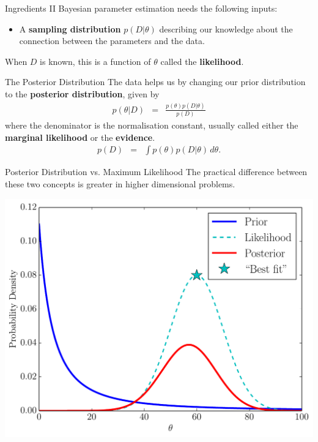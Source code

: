\documentclass{beamer}
\begin{document}
\begin{frame}[t]{Ingredients II}
Bayesian parameter estimation needs the following inputs:
\begin{itemize}
\item A {\bf sampling distribution} $p(D | \theta)$ describing our knowledge
about the connection between the parameters and the data.
\end{itemize}

When $D$ is known,
this is a function of $\theta$ called the {\bf likelihood}.
\end{frame}


\begin{frame}[t]{The Posterior Distribution}
The data helps us by changing our prior distribution to the {\bf posterior
distribution}, given by
\begin{eqnarray*}
p(\theta | D) &=& \frac{p(\theta) p(D|\theta)}{p(D)}
\end{eqnarray*}
where the denominator is the normalisation constant, usually called either
the {\bf marginal likelihood} or the {\bf evidence}.
\begin{eqnarray*}
p(D) &=& \int p(\theta)p(D|\theta) \, d\theta.
\end{eqnarray*}

\end{frame}

\begin{frame}[t]{Posterior Distribution vs. Maximum Likelihood}
The practical difference between these two concepts is greater in higher
dimensional problems.
\begin{center}
\includegraphics[scale=0.35]{figures/bayes.pdf}
\end{center}
\end{frame}
\end{document}
